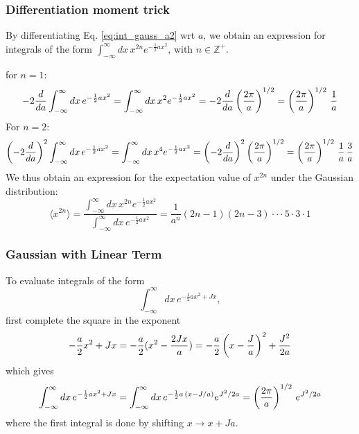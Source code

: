 \documentclass[11pt]{article}
\begin{document}
\subsubsection{Differentiation moment trick}
By differentiating Eq. \ref{eq:int_gauss_a2} wrt $a$, we obtain an expression for
integrals of the form $\int_{-\infty}^{\infty}dx \, x^{2n} e^{-\frac{1}{2} a x^2}$, with
$n \in \mathbb{Z^+}$.

\eeg for $n=1$:
\begin{equation}
  - 2 \frac{d}{da} \int_{-\infty}^{\infty}dx \, e^{-\frac{1}{2} a x^2} =
  \int_{-\infty}^{\infty}dx \, x^2 e^{-\frac{1}{2} a x^2} =
  - 2 \frac{d}{da} \left( \frac{2\pi}{a} \right)^{1/2} =
  \left( \frac{2\pi}{a} \right)^{1/2} \, \frac{1}{a} 
\end{equation}
For $n=2$:
\begin{equation}
  \left( -2 \frac{d}{da} \right)^2 \int_{-\infty}^{\infty}dx \, e^{-\frac{1}{2} a x^2} =
  \int_{-\infty}^{\infty}dx \, x^4 e^{-\frac{1}{2} a x^2} =
  \left( -2 \frac{d}{da} \right)^2 \left( \frac{2\pi}{a} \right)^{1/2} =
  \left( \frac{2\pi}{a} \right)^{1/2} \, \frac{1}{a} \, \frac{3}{a}
\end{equation}
We thus obtain an expression for the expectation value of $x^{2n}$ under the Gaussian
distribution: 
\begin{equation}
  \langle x^{2n} \rangle =
  \frac{\int_{-\infty}^{\infty}dx \, x^{2n} e^{-\frac{1}{2} a x^2}}
       {\int_{-\infty}^{\infty}dx \, e^{-\frac{1}{2} a x^2}} =
  \frac{1}{a^n} (2n-1) (2n-3) \cdot\cdot\cdot 5 \cdot 3 \cdot 1
\end{equation}

\subsubsection{Gaussian with Linear Term}
To evaluate integrals of the form
\begin{equation}
  \label{eq:int_gauss_a2_j}
  \int_{-\infty}^{\infty} dx\, e^{-\frac{1}{2} a x^2 + J x},
\end{equation}
first complete the square in the exponent
\begin{equation}
  -\frac{a}{2} x^2 + J x = -\frac{a}{2} (x^2 - \frac{2Jx}{a}) =
  -\frac{a}{2} \left( x - \frac{J}{a} \right)^2 + \frac{J^2}{2a}
\end{equation}
which gives
\begin{equation}
  \int_{-\infty}^{\infty} dx\, e^{-\frac{1}{2} a x^2 + J x} =
  \int_{-\infty}^{\infty} dx\, e^{-\frac{1}{2} a\, \left( x - J/a \right)} e^{J^2 / 2a} =
  \left(\frac{2\pi}{a} \right)^{1/2} \, e^{J^2 / 2a}
\end{equation}
where the first integral is done by shifting $x \to x + J a$.
\end{document}
